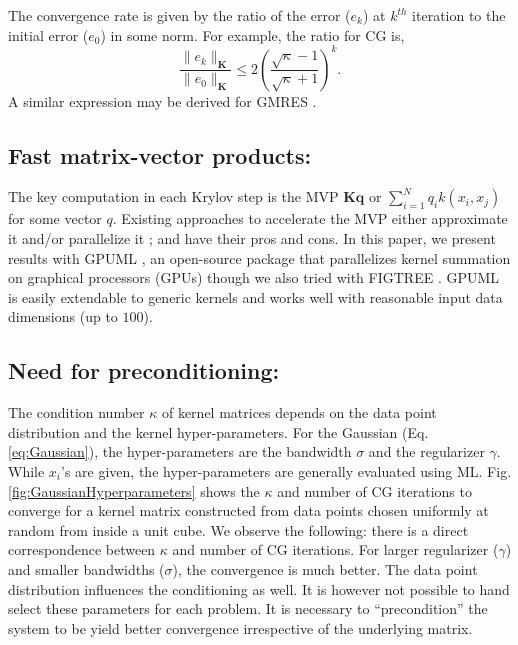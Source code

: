 \documentclass[10pt,journal,letterpaper,compsoc]{IEEEtran}
\begin{document}
The convergence rate is given by the ratio of the error ($e_k$) at $k^{th}$ iteration to the initial error ($e_0$) in some norm. For example, the ratio for CG \cite{SaadIterativeMethods} is,
 \begin{equation}\frac{\|e_k\|_\mathbf{K}}{\|e_0\|_\mathbf{K}}\le2\left(\frac{\sqrt{\kappa}-1}{\sqrt{\kappa}+1}\right)^k.\end{equation}
 A similar expression may be derived for GMRES \cite{SaadIterativeMethods}.

\subsection{Fast matrix-vector products: }
The key computation in each Krylov step is the MVP $\mathbf{Kq}$ or $\sum_{i=1}^{N}q_{i}k(x_{i},x_{j})$ for some vector $q$. Existing approaches to accelerate the MVP either approximate it \cite{IFGT_Yang,IFGT_Raykar,DualTree,FIGTREE} and/or parallelize it \cite{GPUML}; and have their pros and cons. In this paper, we present results with GPUML \cite{GPUML}, an open-source package that parallelizes kernel summation on graphical processors (GPUs) though we also tried with FIGTREE \cite{FIGTREE}. GPUML is easily extendable to generic kernels and works well with reasonable input data dimensions (up to $100$).

\subsection{Need for preconditioning: }The condition number $\kappa$ of kernel matrices depends on the data point distribution and the kernel hyper-parameters. For the Gaussian (Eq. \ref{eq:Gaussian}), the hyper-parameters are the bandwidth $\sigma$ and the regularizer $\gamma$. While $x_i$'s are given, the hyper-parameters are generally evaluated using ML. Fig. \ref{fig:GaussianHyperparameters} shows the $\kappa$ and number of CG iterations to converge for a kernel matrix constructed from data points chosen uniformly at random from inside a unit cube. We observe the following: there is a direct correspondence between $\kappa$ and number of CG iterations. For larger regularizer ($\gamma$) and smaller bandwidths ($\sigma$), the convergence is much better. The data point distribution influences the conditioning as well. It is however not possible to hand select these parameters for each problem. It is necessary to ``precondition'' \cite{SaadIterativeMethods} the system to be yield better convergence irrespective of the underlying matrix.
\end{document}
